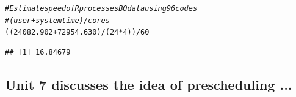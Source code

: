 \documentclass{article}\usepackage[]{graphicx}\usepackage[]{color}
\makeatletter
\newcommand{\hlnum}[1]{\textcolor[rgb]{0.686,0.059,0.569}{#1}}%
\newcommand{\hlcom}[1]{\textcolor[rgb]{0.678,0.584,0.686}{\textit{#1}}}%
\newcommand{\hlopt}[1]{\textcolor[rgb]{0,0,0}{#1}}%
\newcommand{\hlstd}[1]{\textcolor[rgb]{0.345,0.345,0.345}{#1}}%
\newenvironment{kframe}{%
 \def\at@end@of@kframe{}%
 \ifinner\ifhmode%
  \def\at@end@of@kframe{\end{minipage}}%
  \begin{minipage}{\columnwidth}%
 \fi\fi%
 \def\FrameCommand##1{\hskip\@totalleftmargin \hskip-\fboxsep
 \colorbox{shadecolor}{##1}\hskip-\fboxsep
     \hskip-\linewidth \hskip-\@totalleftmargin \hskip\columnwidth}%
 \MakeFramed {\advance\hsize-\width
   \@totalleftmargin\z@ \linewidth\hsize
   \@setminipage}}%
 {\par\unskip\endMakeFramed%
 \at@end@of@kframe}
\newenvironment{knitrout}{}{} %
\makeatother
\begin{document}
\begin{knitrout}
\color{fgcolor}\begin{kframe}
\begin{alltt}
\hlcom{#Estimate speed of R processes BO data using 96 codes}
    \hlcom{#(user + system time) / cores}
\hlstd{((}\hlnum{24082.902} \hlopt{+} \hlnum{72954.630} \hlstd{)} \hlopt{/} \hlstd{(}\hlnum{24} \hlopt{*} \hlnum{4}\hlstd{))} \hlopt{/} \hlnum{60}
\end{alltt}
\begin{verbatim}
## [1] 16.84679
\end{verbatim}
\end{kframe}
\end{knitrout}


\subsection{Unit 7 discusses the idea of prescheduling ...}
\end{document}
